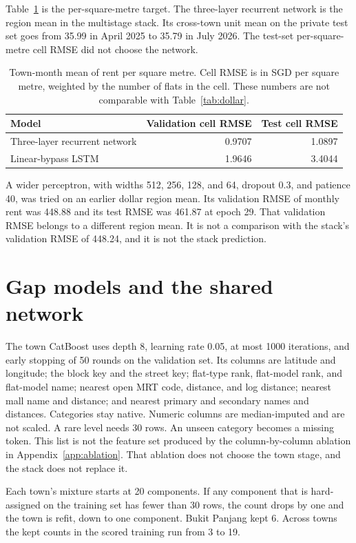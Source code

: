 \documentclass[11pt,a4paper]{article}
\begin{document}
Table~\ref{tab:unit} is the per-square-metre target.
The three-layer recurrent network is the region mean in the multistage stack.
Its cross-town unit mean on the private test set goes from 35.99 in April 2025 to 35.79 in July 2026.
The test-set per-square-metre cell RMSE did not choose the network.

\begin{table}[htbp]
\centering
\caption{Town-month mean of rent per square metre.
Cell RMSE is in SGD per square metre, weighted by the number of flats in the cell.
These numbers are not comparable with Table~\ref{tab:dollar}.}
\label{tab:unit}
\small
\begin{tabular}{lrr}
\toprule
Model & Validation cell RMSE & Test cell RMSE \\
\midrule
Three-layer recurrent network & 0.9707 & 1.0897 \\
Linear-bypass LSTM & 1.9646 & 3.4044 \\
\bottomrule
\end{tabular}
\end{table}

A wider perceptron, with widths 512, 256, 128, and 64, dropout 0.3, and patience 40, was tried on an earlier dollar region mean.
Its validation RMSE of monthly rent was 448.88 and its test RMSE was 461.87 at epoch 29.
That validation RMSE belongs to a different region mean.
It is not a comparison with the stack's validation RMSE of 448.24, and it is not the stack prediction.

\section{Gap models and the shared network}
\label{app:gap}

The town CatBoost uses depth 8, learning rate 0.05, at most 1000 iterations, and early stopping of 50 rounds on the validation set.
Its columns are latitude and longitude; the block key and the street key; flat-type rank, flat-model rank, and flat-model name; nearest open MRT code, distance, and log distance; nearest mall name and distance; and nearest primary and secondary names and distances.
Categories stay native.
Numeric columns are median-imputed and are not scaled.
A rare level needs 30 rows.
An unseen category becomes a missing token.
This list is not the feature set produced by the column-by-column ablation in Appendix~\ref{app:ablation}.
That ablation does not choose the town stage, and the stack does not replace it.

Each town's mixture starts at 20 components.
If any component that is hard-assigned on the training set has fewer than 30 rows, the count drops by one and the town is refit, down to one component.
Bukit Panjang kept 6.
Across towns the kept counts in the scored training run from 3 to 19.
\end{document}
